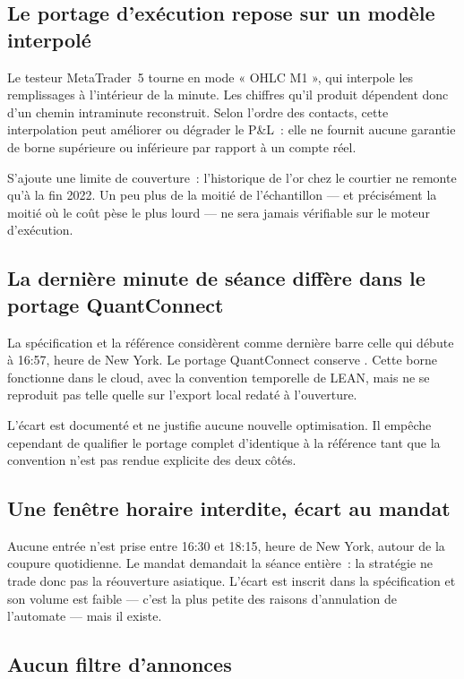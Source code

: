 \subsection{Le portage d'exécution repose sur un modèle interpolé}

Le testeur MetaTrader~5 tourne en mode « OHLC M1 », qui interpole les
remplissages à l'intérieur de la minute. Les chiffres qu'il produit dépendent
donc d'un chemin intraminute reconstruit. Selon l'ordre des contacts, cette
interpolation peut améliorer ou dégrader le P\&L~: elle ne fournit aucune
garantie de borne supérieure ou inférieure par rapport à un compte réel.

S'ajoute une limite de couverture~: l'historique de l'or chez le courtier ne
remonte qu'à la fin 2022. Un peu plus de la moitié de l'échantillon --- et
précisément la moitié où le coût pèse le plus lourd --- ne sera jamais
vérifiable sur le moteur d'exécution.

\subsection{La dernière minute de séance diffère dans le portage QuantConnect}

La spécification et la référence considèrent comme dernière barre celle qui
débute à 16:57, heure de New York. Le portage QuantConnect conserve
. Cette borne fonctionne dans le cloud,
avec la convention temporelle de LEAN, mais ne se reproduit pas telle quelle
sur l'export local redaté à l'ouverture.

L'écart est documenté et ne justifie aucune nouvelle optimisation. Il empêche
cependant de qualifier le portage complet d'identique à la référence tant que
la convention n'est pas rendue explicite des deux côtés.

\subsection{Une fenêtre horaire interdite, écart au mandat}

Aucune entrée n'est prise entre 16:30 et 18:15, heure de New York, autour de
la coupure quotidienne. Le mandat demandait la séance entière~: la stratégie
ne trade donc pas la réouverture asiatique. L'écart est inscrit dans la
spécification et son volume est faible --- c'est la plus petite des raisons
d'annulation de l'automate --- mais il existe.

\subsection{Aucun filtre d'annonces}

